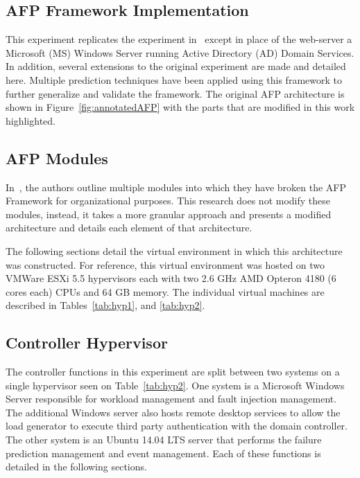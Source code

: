 \subsection{AFP Framework Implementation}
This experiment replicates the experiment in~\cite{irrera2015} except in place
of the web-server a Microsoft (MS) Windows Server running Active Directory (AD)
Domain Services.  In addition, several extensions to the original experiment
are made and detailed here.  Multiple prediction techniques have been applied
using this framework to further generalize and validate the framework.  The
original AFP architecture is shown in Figure~\ref{fig:annotatedAFP} with the
parts that are modified in this work highlighted.  

\subsection{AFP Modules}
In~\cite{irrera2015}, the authors outline multiple modules into which they have
broken the AFP Framework for organizational purposes.  This research does not
modify these modules, instead, it takes a more granular approach and presents a
modified architecture and details each element of that architecture.

\figannotatedAFP  

The following sections detail the virtual environment in which this
architecture was constructed.  For reference, this virtual environment was
hosted on two VMWare ESXi 5.5 hypervisors each with two 2.6 GHz AMD Opteron
4180 (6 cores each) CPUs and 64 GB memory.  The individual virtual machines are
described in Tables~\ref{tab:hyp1}, and \ref{tab:hyp2}.

\tabHypervisorOne
\tabHypervisorTwo

\setcounter{secnumdepth}{5}

\subsection{Controller Hypervisor} \label{sec:controller} %
The controller functions in this experiment are split between two systems on a
single hypervisor seen on Table~\ref{tab:hyp2}.  One system is a Microsoft
Windows Server responsible for workload management and fault injection
management.  The additional Windows server also hosts remote desktop services
to allow the load generator to execute third party authentication with the
domain controller.  The other system is an Ubuntu 14.04 LTS server that
performs the failure prediction management and event management.  Each of
these functions is detailed in the following sections.

